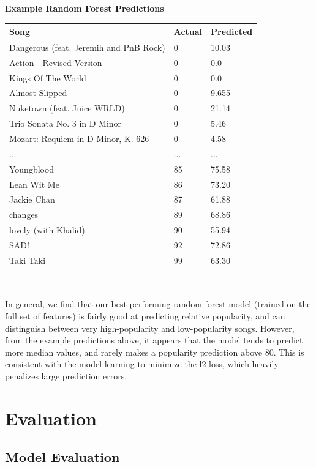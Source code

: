 \documentclass[journal]{IEEEtran}
\begin{document}
\begin{center}
\textbf{Example Random Forest Predictions}
\begin{tabular}{|l|l|l|}
\hline
\textbf{Song} & \textbf{Actual} & \textbf{Predicted} \\ \hline
Dangerous (feat. Jeremih and PnB Rock)  & 0 & 10.03   \\ \hline
Action - Revised Version & 0 & 0.0 \\ \hline
Kings Of The World   & 0 & 0.0  \\ \hline
Almost Slipped  & 0 & 9.655  \\ \hline
Nuketown (feat. Juice WRLD) & 0 & 21.14 \\ \hline
Trio Sonata No. 3 in D Minor  & 0 & 5.46 \\ \hline
Mozart: Requiem in D Minor, K. 626 & 0 & 4.58  \\ \hline
... & ... & ... \\ \hline
Youngblood & 85 & 75.58 \\ \hline
Lean Wit Me & 86 & 73.20 \\ \hline
Jackie Chan & 87 & 61.88 \\ \hline
changes & 89 & 68.86 \\ \hline
lovely (with Khalid) & 90 & 55.94 \\ \hline
SAD! & 92 & 72.86 \\ \hline
Taki Taki & 99 & 63.30 \\ \hline
\end{tabular} \\
\end{center}

\quad\newline
In general, we find that our best-performing random forest model (trained on the full set of features) is fairly good at predicting relative popularity, and can distinguish between very high-popularity and low-popularity songs. However, from the example predictions above, it appears that the model tends to predict more median values, and rarely makes a popularity prediction above 80. This is consistent with the model learning to minimize the l2 loss, which heavily penalizes large prediction errors.

\section{Evaluation}

\subsection{Model Evaluation}
\end{document}
